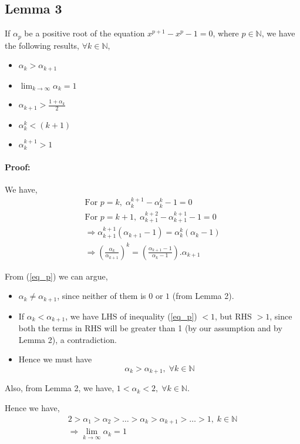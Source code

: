 \documentclass{ijcsa}
\begin{document}
\subsection{Lemma 3}
\label{sec:Lemma3}
\par If $\alpha_{p}$ be a positive root of the equation $x^{p+1}-x^{p}-1=0$, where $p \in \mathbb{N}$, we have the following results, $\forall{k}\in\mathbb{N}$,
\begin{itemize}
\item	$\alpha_{k}>\alpha_{k+1}$
\item	$\lim_{k \rightarrow \infty}{\alpha_{k}}=1$ 
\item	$\alpha_{k+1}>\frac{1+\alpha_{k}}{2}$
\item	$\alpha_{k}^{k}<(k+1)$
\item	$\alpha_{k}^{k+1}>1$
\end{itemize}
\paragraph{Proof:}
\label{sec:Proof_3}
We have,
\begin{eqnarray}
\label{eq_p}
\mbox{For } p=k, \; \alpha_{k}^{k+1}-\alpha_{k}^{k}-1=0	\nonumber \\
\mbox{For } p=k+1, \; \alpha_{k+1}^{k+2}-\alpha_{k+1}^{k+1}-1=0	\nonumber \\
\Rightarrow \alpha_{k+1}^{k+1}(\alpha_{k+1}-1)=\alpha_{k}^{k}(\alpha_{k}-1) \nonumber \\
\Rightarrow \left(\frac{\alpha_{k}}{\alpha_{k+1}}\right)^{k}=\left(\frac{\alpha_{k+1}-1}{\alpha_{k}-1}\right).\alpha_{k+1}
\end{eqnarray}
\par From (\ref{eq_p}) we can argue,
\begin{itemize}
\item	$\alpha_{k}\neq\alpha_{k+1}$, since neither of them is $0$ or $1$ (from Lemma 2).
\item If $\alpha_{k}<\alpha_{k+1}$, we have LHS of inequality (\ref{eq_p}) $<1$, but RHS $>1$, since both 
the terms in RHS will be greater than 1 (by our assumption and by Lemma 2), a contradiction. 
\item Hence we must have 
	\begin{equation}
		\label{eq_p_1}
		\alpha_{k}>\alpha_{k+1}, \;\forall{k}\in\mathbb{N}
	\end{equation}
\end{itemize}
\par Also, from Lemma 2, we have, $1<\alpha_{k}<2,\;\forall{k}\in\mathbb{N}$.
\par Hence we have,
	\begin{eqnarray*}
		\label{eq_p_1_1}
		2>\alpha_{1}>\alpha_{2}>\ldots>\alpha_{k}>\alpha_{k+1}>\ldots>1, \;k\in\mathbb{N} \\
		\Rightarrow \lim_{k \rightarrow \infty}{\alpha_{k}}=1
	\end{eqnarray*}
	
\end{document}
